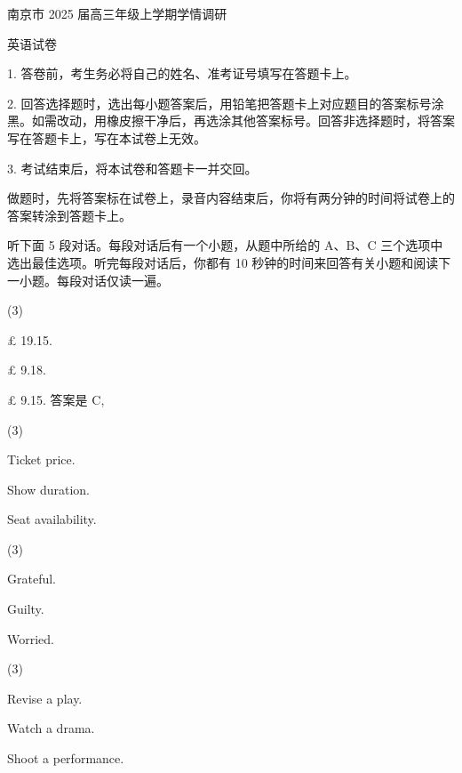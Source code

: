 \documentclass{英语试卷}
\begin{document}
\par 南京市 2025 届高三年级上学期学情调研\par
\par 英语试卷\par
\begin{notice}
\par 1. 答卷前，考生务必将自己的姓名、准考证号填写在答题卡上。\par
\par 2. 回答选择题时，选出每小题答案后，用铅笔把答题卡上对应题目的答案标号涂黑。如需改动，用橡皮擦干净后，再选涂其他答案标号。回答非选择题时，将答案写在答题卡上，写在本试卷上无效。\par
\par 3. 考试结束后，将本试卷和答题卡一并交回。\par
\end{notice}
\par 做题时，先将答案标在试卷上，录音内容结束后，你将有两分钟的时间将试卷上的答案转涂到答题卡上。\par
{}
\par 听下面 5 段对话。每段对话后有一个小题，从题中所给的 A、B、C 三个选项中选出最佳选项。听完每段对话后，你都有 10 秒钟的时间来回答有关小题和阅读下一小题。每段对话仅读一遍。\par
{}
\begin{choices}(3)
  \item £ 19.15.
  \item £ 9.18.
  \item £ 9.15. 答案是 C,
\end{choices}
\begin{choices}(3)
  \item Ticket price.
  \item Show duration.
  \item Seat availability.
\end{choices}
\begin{choices}(3)
  \item Grateful.
  \item Guilty.
  \item Worried.
\end{choices}
\begin{choices}(3)
  \item Revise a play.
  \item Watch a drama.
  \item Shoot a performance.
\end{choices}
\end{document}
